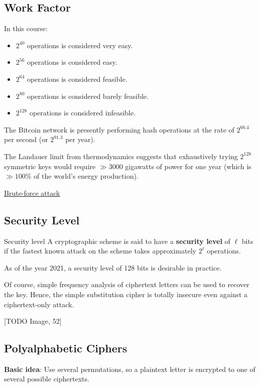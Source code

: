\subsection*{Work Factor}
In this course:
\begin{itemize}
      \item $2^{40}$ operations is considered very easy.
      \item $2^{56}$ operations is considered easy.
      \item $2^{64}$ operations is considered feasible.
      \item $2^{80}$ operations is considered barely feasible.
      \item $2^{128}$ operations is considered infeasible.
\end{itemize}
The Bitcoin network is presently performing hash operations at
the rate of $2^{66.4}$ per second (or $2^{91.3}$ per year).

The Landauer limit from thermodynamics suggests that exhaustively
trying $2^{128}$ symmetric keys would require $\gg 3000$ gigawatts of
power for one year (which is $\gg 100 \%$ of the world's energy production).

\href{http://en.wikipedia.org/wiki/Brute-force_attack}{Brute-force attack}

\subsection*{Security Level}
\begin{Definition}{Security level}{}
      A cryptographic scheme is
      said to have a \textbf{security level} of $\ell$ bits if
      the fastest known attack on the scheme takes
      approximately $2^{\ell}$ operations.
\end{Definition}
As of the year 2021, a security level of 128 bits is desirable in practice.

Of course, simple frequency analysis of ciphertext letters can be used to recover the key.
Hence, the simple substitution cipher is totally insecure even against a
ciphertext-only attack.

      [TODO Image, 52]

\subsection*{Polyalphabetic Ciphers}
\textbf{Basic idea}: Use several permutations, so a plaintext letter is
encrypted to one of several possible ciphertexts.


